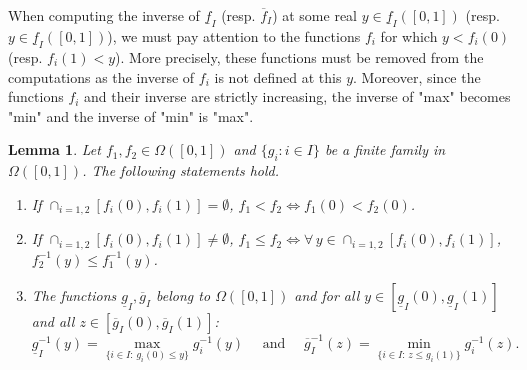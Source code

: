 \documentclass{article}
\def\fset{\Omega([0,1])}
\newtheorem{lemma}{Lemma}
\def\blue#1{#1}
\begin{document}
\blue{
When computing the inverse of $\underline{f}_I$ (resp. $\overline{f}_I$) at some real $y\in \underline{f}_I([0,1])$ (resp. $y\in \underline{f}_I([0,1])$), we must pay attention to the functions $f_i$ for which $y<f_i(0)$ (resp. $f_i(1)<y$). More precisely, these functions must be removed from the computations as the inverse of $f_i$ is not defined at this $y$. Moreover, since the functions $f_i$ and their inverse are strictly increasing, the inverse of "max" becomes "min" and the inverse of "min" is "max".  	
}
	\begin{lemma}
		\label{invcompare}
		Let \blue{$f_1,f_2\in \fset$} and \blue{$\{g_i:i\in I\}$} be a finite family in $\fset$. The following statements hold.
		\begin{enumerate}
			\item If $\blue{\displaystyle{\mathop{\cap}_{i=1,2}}[f_i(0),f_i(1)]}=\emptyset$, \blue{$f_1< f_2\iff f_1(0)<f_2(0)$}.
			\item If $\blue{\displaystyle{\mathop{\cap}_{i=1,2}}[f_i(0),f_i(1)]}\neq\emptyset$, $f_1\leq f_2\iff \forall\, y\in\blue{\displaystyle{\mathop{\cap}_{i=1,2}}[f_i(0),f_i(1)]}$,  $f_2^{-1}(y)\leq f_1^{-1}(y)$.
			\item  The functions \blue{$\underline{g}_I,\overline{g}_I$} belong to $\fset$ and for all $y\in \blue{[\underline{g}_I(0),\underline{g}_{I}(1)]}$ and all $z\in \blue{[\overline{g}_I(0),\overline{g}_{I}(1)]}$:
			\[\blue{\underline{g}_I^{-1}(y)=\max_{\{i\in I:\, g_i(0)\leq y\}} g_i^{-1}(y)}\quad\text{ and
			}\quad \blue{\overline{g}_I^{-1}(z)=\min_{\{i\in I:\, z\leq g_i(1)\}} g_i^{-1}(z)}.\]
		\end{enumerate}
	\end{lemma}
	
\end{document}
